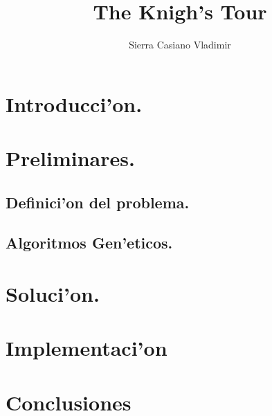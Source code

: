 \documentclass[11pt]{article}
\title{
    The Knigh's Tour }
\author{Sierra Casiano Vladimir}
\begin{document}
    \maketitle
    
    \section{Introducci'on.}

    \section{Preliminares.}

    \subsection{Definici'on del problema.}
    \subsection{Algoritmos Gen'eticos.}

    \section{Soluci'on.}
    \section{Implementaci'on}
    
    \section{Conclusiones}
\end{document}
